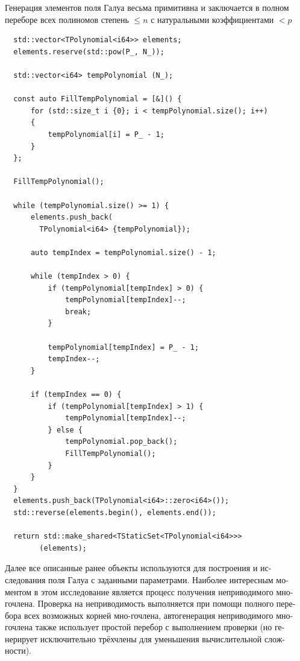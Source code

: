 \documentclass[a4paper]{article}
\newenvironment{code}{\captionsetup{type=listing}}{}
\begin{document}
Генерация элементов поля Галуа весьма примитивна и заключается в полном переборе всех полиномов степень $\le n$ с натуральными коэффициентами $< p$
\begin{code}
\begin{verbatim}
  std::vector<TPolynomial<i64>> elements;
  elements.reserve(std::pow(P_, N_));

  std::vector<i64> tempPolynomial (N_);

  const auto FillTempPolynomial = [&]() {
      for (std::size_t i {0}; i < tempPolynomial.size(); i++)
      {
          tempPolynomial[i] = P_ - 1;
      }
  };

  FillTempPolynomial();

  while (tempPolynomial.size() >= 1) {
      elements.push_back(
        TPolynomial<i64> {tempPolynomial});

      auto tempIndex = tempPolynomial.size() - 1;

      while (tempIndex > 0) {
          if (tempPolynomial[tempIndex] > 0) {
              tempPolynomial[tempIndex]--;
              break;
          }

          tempPolynomial[tempIndex] = P_ - 1;
          tempIndex--;
      }

      if (tempIndex == 0) {
          if (tempPolynomial[tempIndex] > 1) {
              tempPolynomial[tempIndex]--;
          } else {
              tempPolynomial.pop_back();
              FillTempPolynomial();
          }
      }
  }
  elements.push_back(TPolynomial<i64>::zero<i64>());
  std::reverse(elements.begin(), elements.end());
  
  return std::make_shared<TStaticSet<TPolynomial<i64>>>
        (elements);
\end{verbatim}
\end{code}

Далее все описанные ранее объекты используются для построения и ис-следования поля Галуа с заданными параметрами.
Наиболее интересным мо-ментом в этом исследование является процесс получения неприводимого мно-гочлена.
Проверка на неприводимость выполняется при помощи полного пере-бора всех возможных корней мно-гочлена, автогенерация неприводимого
мно-гочлена также использует простой перебор с выполнением проверки (но ге-нерирует исключительно трёхчлены для уменьшения вычислительной слож-ности).
\end{document}
